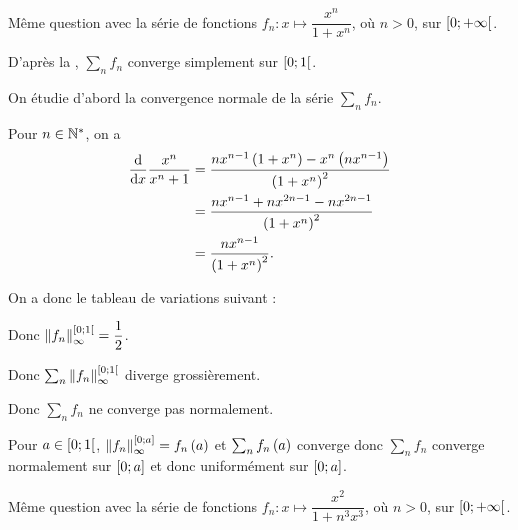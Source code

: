 \begin{exo}
Même question avec la série de fonctions \(f_n:x\mapsto\dfrac{x^n}{1+x^n}\), où \(n>0\), sur \(\left[0;+\infty\right[\).
\end{exo}

\begin{corr}
D'après la , \(\sum_nf_n\) converge simplement sur \(\left[0;1\right[\).

On étudie d'abord la convergence normale de la série \(\sum_nf_n\).

Pour \(n\in\mathbb{N}^*\), on a \[\begin{aligned}
\odv*{\dfrac{x^n}{x^n+1}}{x}&=\dfrac{nx^{n-1}\paren{1+x^n}-x^n\paren{nx^{n-1}}}{\paren{1+x^n}^2} \\
&=\dfrac{nx^{n-1}+nx^{2n-1}-nx^{2n-1}}{\paren{1+x^n}^2} \\
&=\dfrac{nx^{n-1}}{\paren{1+x^n}^2}.
\end{aligned}\]

On a donc le tableau de variations suivant :

\begin{center}
\end{center}

Donc \(\norme{f_n}_\infty^{\intervie{0}{1}}=\dfrac{1}{2}\).

Donc \(\sum_n\norme{f_n}_\infty^{\intervie{0}{1}}\) diverge grossièrement.

Donc \(\sum_nf_n\) ne converge pas normalement.

Pour \(a\in\left[0;1\right[\), \(\norme{f_n}_\infty^{\intervii{0}{a}}=f_n\paren{a}\) et \(\sum_nf_n\left(a\right)\) converge donc \(\sum_nf_n\) converge normalement sur \(\left[0;a\right]\) et donc uniformément sur \(\left[0;a\right]\).
\end{corr}

\begin{exo}
Même question avec la série de fonctions \(f_n:x\mapsto\dfrac{x^2}{1+n^3x^3}\), où \(n>0\), sur \(\left[0;+\infty\right[\).
\end{exo}

